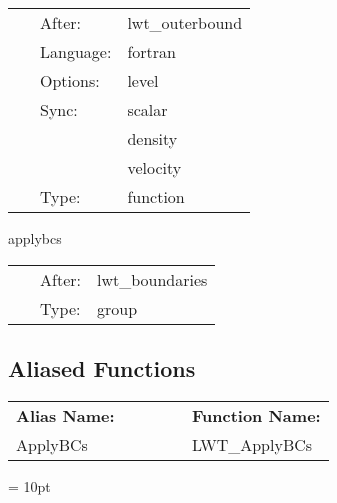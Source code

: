 \documentclass{article}
\begin{document}
\hspace{5mm}{\it select the boundary condition } 


\hspace{5mm}

 \begin{tabular*}{160mm}{cll} 
~ & After:  & lwt\_outerbound \\ 
~ & Language:  & fortran \\ 
~ & Options:  & level \\ 
~ & Sync:  & scalar \\ 
~& ~ &density\\ 
~& ~ &velocity\\ 
~ & Type:  & function \\ 
\end{tabular*} 


\vspace{5mm}


\hspace{5mm} applybcs 

\hspace{5mm}{\it apply boundary conditions } 


\hspace{5mm}

 \begin{tabular*}{160mm}{cll} 
~ & After:  & lwt\_boundaries \\ 
~ & Type:  & group \\ 
\end{tabular*} 


\subsection*{Aliased Functions}

\hspace{5mm}

 \begin{tabular*}{160mm}{ll} 

{\bf Alias Name:} ~~~~~~~ & {\bf Function Name:} \\ 
ApplyBCs & LWT\_ApplyBCs \\ 
\end{tabular*} 



\vspace{5mm}\parskip = 10pt 
\end{document}
